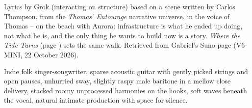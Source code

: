 
\label{sec:not-an-infrastructure-guy}
\begin{notes}
Lyrics by Grok (interacting on structure) based on a scene written by Carlos Thompson, from the \emph{Thomas' Entourage} narrative universe, in the voice of Thomas -- on the beach with Aurora: infrastructure is what he ended up doing, not what he is, and the only thing he wants to build now is a story. \emph{Where the Tide Turns} (page \pageref{sec:where-the-tide-turns}) sets the same walk. Retrieved from Gabriel's Suno page (V6-MINI, 22 October 2026).
\end{notes}
\begin{style}
Indie folk singer-songwriter, sparse acoustic guitar with gently picked strings and open pauses, unhurried sway, slightly raspy male baritone in a mellow close delivery, stacked roomy unprocessed harmonies on the hooks, soft waves beneath the vocal, natural intimate production with space for silence.
\end{style}
